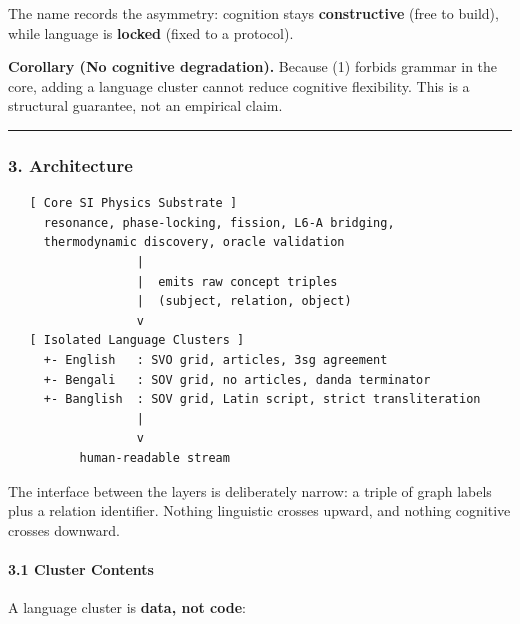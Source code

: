 \documentclass[
  11pt,
  a4paper,
]{article}
\begin{document}
The name records the asymmetry: cognition stays \textbf{constructive}
(free to build), while language is \textbf{locked} (fixed to a
protocol).

\textbf{Corollary (No cognitive degradation).} Because (1) forbids
grammar in the core, adding a language cluster cannot reduce cognitive
flexibility. This is a structural guarantee, not an empirical claim.

\begin{center}\rule{0.5\linewidth}{0.5pt}\end{center}

\subsubsection{3. Architecture}\label{architecture}

\begin{verbatim}
   [ Core SI Physics Substrate ]
     resonance, phase-locking, fission, L6-A bridging,
     thermodynamic discovery, oracle validation
                  |
                  |  emits raw concept triples
                  |  (subject, relation, object)
                  v
   [ Isolated Language Clusters ]
     +- English   : SVO grid, articles, 3sg agreement
     +- Bengali   : SOV grid, no articles, danda terminator
     +- Banglish  : SOV grid, Latin script, strict transliteration
                  |
                  v
          human-readable stream
\end{verbatim}

The interface between the layers is deliberately narrow: a triple of
graph labels plus a relation identifier. Nothing linguistic crosses
upward, and nothing cognitive crosses downward.

\paragraph{3.1 Cluster Contents}\label{cluster-contents}

A language cluster is \textbf{data, not code}:
\end{document}
